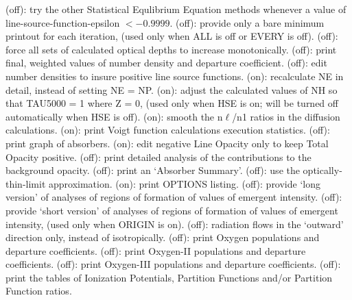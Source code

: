 \space \vbox { (off): \bang
try the other Statistical Equlibrium Equation methods whenever a value of
line-source-function-epsilon $ < -0.9999$.}
\space \vbox { (off): \bang
provide only a bare minimum printout for each iteration, (used only when
ALL is off or EVERY is off).}
\space \vbox { (off): \bang
force all sets of calculated optical depths to increase monotonically.}
\space \vbox { (off): \bang
print final, weighted values of number density and departure coefficient.}
\space \vbox { (off): \bang
edit number densities to insure positive line source functions.}
\space \vbox { (on): \bang
recalculate NE in detail, instead of setting NE = NP.}
\space \vbox { (on): \bang
adjust the calculated values of NH so that TAU5000 = 1 where Z = 0,
(used only when HSE is on; will be turned off automatically when HSE is off).}
\space \vbox { (on): \bang
smooth the n$\ell$/n1 ratios in the diffusion calculations.}
\space \vbox { (on): \bang
print Voigt function calculations execution statistics.}
\space \vbox { (off): \bang
print graph of absorbers.}
\space \vbox { (on): \bang
edit negative Line Opacity only to keep Total Opacity positive.}
\space \vbox { (off): \bang
print detailed analysis of the contributions to the background opacity.}
\space \vbox { (off): \bang 
print an `Absorber Summary'.}
\space \vbox { (off): \bang
use the optically-thin-limit approximation.}
\space \vbox { (on): \bang
print OPTIONS listing.}
\space \vbox { (off): \bang
provide `long version' of analyses of regions of formation of values of 
emergent intensity.}
\space \vbox { (off): \bang
provide `short version' of analyses of regions of formation of values of
emergent intensity, (used only when ORIGIN is on).}
\space \vbox { (off): \bang
radiation flows in the `outward' direction only, instead of isotropically.}
\space \vbox { (off): \bang
print Oxygen populations and departure coefficients.}
\space \vbox { (off): \bang
print Oxygen-II populations and departure coefficients.}
\space \vbox { (off): \bang
print Oxygen-III populations and departure coefficients.}
\space \vbox { (off): \bang
print the tables of Ionization Potentials, Partition Functions and/or 
Partition Function ratios.}
